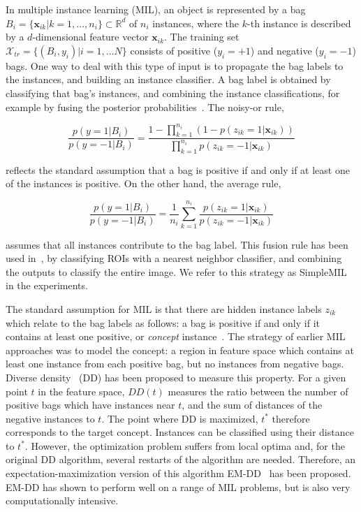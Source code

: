 \documentclass[10pt,conference,a4paper]{IEEEtran}
\begin{document}
In multiple instance learning (MIL), an object is represented by a bag $B_i  = \{\mathbf{x}_{ik}| k=1,...,n_i\} \subset \mathbb{R}^d$ of $n_i$ instances, where the $k$-th instance is described by a $d$-dimensional feature vector $\mathbf{x}_{ik}$. The training set $\mathcal{X}_{tr} = \{(B_i, y_i) | i=1,...N\}$ consists of positive ($y_i = +1$) and negative ($y_i = -1$) bags. One way to deal with this type of input is to propagate the bag labels to the instances, and building an instance classifier.  A bag label is obtained by classifying that bag's instances, and combining the instance classifications, for example by fusing the posterior probabilities~\cite{loog2004static}. The noisy-or rule,

\begin{equation}\label{eq:noisyor}
\frac{p(y=1|B_i)}{p(y=-1|B_i)} = \frac{1 - \prod_{k=1}^{n_i} (1-p(z_{ik}=1|\mathbf{x}_{ik}))}{\prod_{k=1}^{n_i} p(z_{ik}=-1|\mathbf{x}_{ik})}
\end{equation}

reflects the standard assumption that a bag is positive if and only if at least one of the instances is positive. On the other hand, the average rule,

\begin{equation}\label{eq:average}
\frac{p(y=1|B_i)}{p(y=-1|B_i)} = \frac{1}{n_i} \sum_{k=1}^{n_i} \frac{ p(z_{ik}=1|\mathbf{x}_{ik})} {p(z_{ik}=-1|\mathbf{x}_{ik})}
\end{equation}

assumes that all instances contribute to the bag label. This fusion rule has been used in~\cite{sorensen2012texture}, by classifying ROIs with a nearest neighbor classifier, and combining the outputs to classify the entire image. We refer to this strategy as SimpleMIL in the experiments.

The standard assumption for MIL is that there are hidden instance labels $z_{ik}$ which relate to the bag labels as follows: a bag is positive if and only if it contains at least one positive, or \emph{concept} instance~\cite{dietterich1997solving}. The strategy of earlier MIL approaches was to model the concept: a region in feature space which contains at least one instance from each positive bag, but no instances from negative bags. Diverse density~\cite{maron1998framework} (DD) has been proposed to measure this property. For a given point $t$ in the feature space, $DD(t)$ measures the ratio between the number of positive bags which have instances near $t$, and the sum of distances of the negative instances to $t$. The point where DD is maximized, $t^*$ therefore corresponds to the target concept. Instances can be classified using their distance to $t^*$. However, the optimization problem suffers from local optima and, for the original DD algorithm, several restarts of the algorithm are needed. Therefore, an expectation-maximization version of this algorithm EM-DD~\cite{zhang2001dd} has been proposed. EM-DD has shown to perform well on a range of MIL problems, but is also very computationally intensive.
\end{document}
